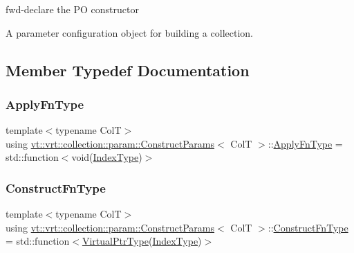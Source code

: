 fwd-\/declare the PO constructor 

A parameter configuration object for building a collection. 

\subsection{Member Typedef Documentation}
\mbox{\label{structvt_1_1vrt_1_1collection_1_1param_1_1_construct_params_a4275ecc44239ac1aeedea9d31e93c78f}} 
\subsubsection{\texorpdfstring{Apply\+Fn\+Type}{ApplyFnType}}
{\footnotesize\ttfamily template$<$typename ColT$>$ \\
using \hyperlink{structvt_1_1vrt_1_1collection_1_1param_1_1_construct_params}{vt\+::vrt\+::collection\+::param\+::\+Construct\+Params}$<$ ColT $>$\+::\hyperlink{structvt_1_1vrt_1_1collection_1_1param_1_1_construct_params_a4275ecc44239ac1aeedea9d31e93c78f}{Apply\+Fn\+Type} =  std\+::function$<$void(\hyperlink{structvt_1_1vrt_1_1collection_1_1param_1_1_construct_params_a7bc8d5d57e377e0f2e60031582eeb7e6}{Index\+Type})$>$}

\mbox{\label{structvt_1_1vrt_1_1collection_1_1param_1_1_construct_params_a7ad7bdf4220701e54b485f45e08b1736}} 
\subsubsection{\texorpdfstring{Construct\+Fn\+Type}{ConstructFnType}}
{\footnotesize\ttfamily template$<$typename ColT$>$ \\
using \hyperlink{structvt_1_1vrt_1_1collection_1_1param_1_1_construct_params}{vt\+::vrt\+::collection\+::param\+::\+Construct\+Params}$<$ ColT $>$\+::\hyperlink{structvt_1_1vrt_1_1collection_1_1param_1_1_construct_params_a7ad7bdf4220701e54b485f45e08b1736}{Construct\+Fn\+Type} =  std\+::function$<$\hyperlink{structvt_1_1vrt_1_1collection_1_1param_1_1_construct_params_ac3715f51f35c3ce6357ef3e9547beb73}{Virtual\+Ptr\+Type}(\hyperlink{structvt_1_1vrt_1_1collection_1_1param_1_1_construct_params_a7bc8d5d57e377e0f2e60031582eeb7e6}{Index\+Type})$>$}

